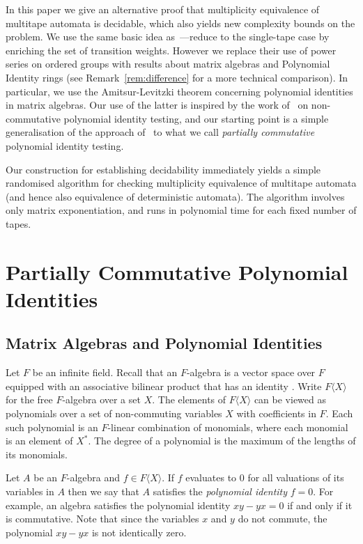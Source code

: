 \documentclass[runningheads]{llncs}
\begin{document}
In this paper we give an alternative proof that multiplicity
equivalence of multitape automata is decidable, which also yields new
complexity bounds on the problem.  We use the same basic idea
as~\cite{HarjuK91}---reduce to the single-tape case by enriching the
set of transition weights.  However we replace their use of power
series on ordered groups with results about matrix algebras and
Polynomial Identity rings (see Remark~\ref{rem:difference} for a more
technical comparison).  In particular, we use the Amitsur-Levitzki
theorem concerning polynomial identities in matrix algebras.  Our use
of the latter is inspired by the work of~\cite{BogdanovW05} on
non-commutative polynomial identity testing, and our starting point is
a simple generalisation of the approach of~\cite{BogdanovW05} to what
we call \emph{partially commutative} polynomial identity testing.

Our construction for establishing decidability immediately yields a
simple randomised algorithm for checking multiplicity equivalence of
multitape automata (and hence also equivalence of deterministic
automata).  The algorithm involves only matrix exponentiation, and
runs in polynomial time for each fixed number of tapes. 





\section{Partially Commutative Polynomial Identities}
\label{sec:semi}

\subsection{Matrix Algebras and Polynomial Identities}

Let $F$ be an infinite field.  Recall that an $F$-algebra is a vector
space over $F$ equipped with an associative bilinear product that has
an identity .  Write $F\langle X \rangle$ for the free $F$-algebra
over a set $X$.  The elements of $F\langle X\rangle$ can be viewed as
polynomials over a set of non-commuting variables $X$ with
coefficients in $F$.  Each such polynomial is an $F$-linear
combination of monomials, where each monomial is an element of $X^*$.
The degree of a polynomial is the maximum of the lengths of its
monomials.

Let $A$ be an $F$-algebra and $f \in F\langle X \rangle$.  If $f$
evaluates to $0$ for all valuations of its variables in $A$ then we
say that $A$ satisfies the \emph{polynomial identity} $f=0$.  For
example, an algebra satisfies the polynomial identity $xy-yx=0$ if and
only if it is commutative.  Note that since the variables $x$ and
$y$ do not commute, the polynomial $xy-yx$ is not identically zero.
\end{document}
